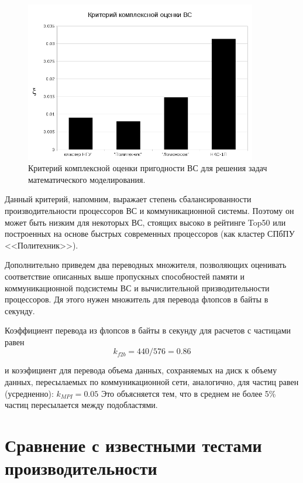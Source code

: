 \begin{figure}[htb]
	\begin{center}
		\includegraphics[height=7cm,keepaspectratio]{images/modern_PIC_params_xi_new.png}
	\end{center}
	\caption{Критерий комплексной оценки пригодности ВС для решения задач математического моделирования.}
	\label{xi}
\end{figure} 
Данный критерий, напомним, выражает степень сбалансированности производительности процессоров ВС и коммуникационной системы. Поэтому он может быть низким для некоторых ВС, стоящих высоко в рейтинге Top50 или построенных на основе быстрых современных процессоров (как кластер СПбПУ <<Политехник>>).

Дополнительно приведем два переводных множителя, позволяющих оценивать соответствие описанных выше пропускных способностей памяти и коммуникационной подсистемы ВС и вычислительной призводительности процессоров. Дя этого нужен множитель для перевода флопсов в байты в секунду.

Коэффициент перевода из флопсов в байты в секунду для расчетов с частицами равен
\begin{equation}
\label{kf2b}
k_{f2b} = 440/576 = 0.86
\end{equation}  
 
и коээфициент для перевода объема данных, сохраняемых на диск к объему данных, пересылаемых по коммуникационной сети, аналогично, для частиц равен (усредненно):
$k_{MPI} = 0.05$ 
Это объясняется тем, что в среднем не более 5\% частиц пересылается между подобластями.




\section{Сравнение с известными тестами производительности}

